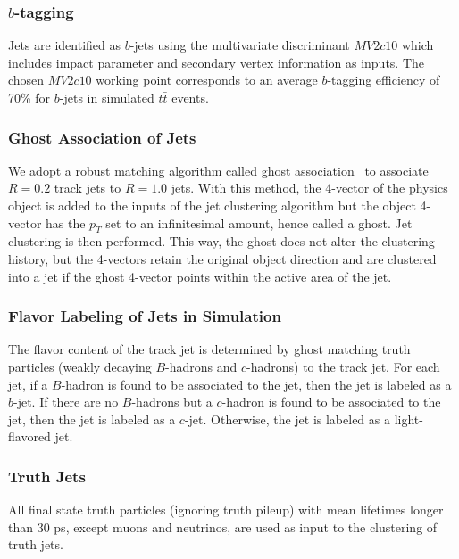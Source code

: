 \subsubsection{$b$-tagging}

Jets are identified as $b$-jets using the multivariate discriminant $MV2c10$ \cite{btag} which includes impact parameter and secondary vertex information as inputs.  The chosen $MV2c10$ working point corresponds to an average $b$-tagging efficiency of 70\% for $b$-jets in simulated $t\bar{t}$ events.  

\subsubsection{Ghost Association of Jets}

We adopt a robust matching algorithm called ghost association~\cite{area} to associate $R=0.2$ track jets to $R=1.0$ jets. With this method, the 4-vector of the physics object is added to the inputs of the jet clustering algorithm but the object 4-vector has the $p_T$ set to an infinitesimal amount, hence called a ghost.  Jet clustering is then performed. This way, the ghost does not alter the clustering history, but the 4-vectors retain the original object direction and are clustered into a jet if the ghost 4-vector points within the active area of the jet.

\subsubsection{Flavor Labeling of Jets in Simulation}

The flavor content of the track jet is determined by ghost matching truth particles (weakly decaying $B$-hadrons and $c$-hadrons) to the track jet. For each jet, if a $B$-hadron is found to be associated to the jet, then the jet is labeled as a $b$-jet.  If there are no $B$-hadrons but a $c$-hadron is found to be associated to the jet, then the jet is labeled as a $c$-jet. Otherwise, the jet is labeled as a light-flavored jet. 

\subsubsection{Truth Jets}

All final state truth particles (ignoring truth pileup) with mean lifetimes longer than 30 ps, except muons and neutrinos, are used as input to the clustering of truth jets. 
